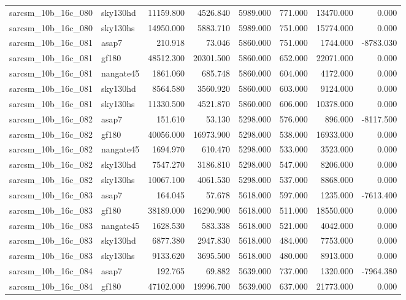 \begin{tabular}{llrrrrrr}
sarcsm\_10b\_16c\_080 & sky130hd & 11159.800 & 4526.840 & 5989.000 & 771.000 & 13470.000 & 0.000 \\
sarcsm\_10b\_16c\_080 & sky130hs & 14950.000 & 5883.710 & 5989.000 & 751.000 & 15774.000 & 0.000 \\
sarcsm\_10b\_16c\_081 & asap7 & 210.918 & 73.046 & 5860.000 & 751.000 & 1744.000 & -8783.030 \\
sarcsm\_10b\_16c\_081 & gf180 & 48512.300 & 20301.500 & 5860.000 & 652.000 & 22071.000 & 0.000 \\
sarcsm\_10b\_16c\_081 & nangate45 & 1861.060 & 685.748 & 5860.000 & 604.000 & 4172.000 & 0.000 \\
sarcsm\_10b\_16c\_081 & sky130hd & 8564.580 & 3560.920 & 5860.000 & 603.000 & 9124.000 & 0.000 \\
sarcsm\_10b\_16c\_081 & sky130hs & 11330.500 & 4521.870 & 5860.000 & 606.000 & 10378.000 & 0.000 \\
sarcsm\_10b\_16c\_082 & asap7 & 151.610 & 53.130 & 5298.000 & 576.000 & 896.000 & -8117.500 \\
sarcsm\_10b\_16c\_082 & gf180 & 40056.000 & 16973.900 & 5298.000 & 538.000 & 16933.000 & 0.000 \\
sarcsm\_10b\_16c\_082 & nangate45 & 1694.970 & 610.470 & 5298.000 & 533.000 & 3523.000 & 0.000 \\
sarcsm\_10b\_16c\_082 & sky130hd & 7547.270 & 3186.810 & 5298.000 & 547.000 & 8206.000 & 0.000 \\
sarcsm\_10b\_16c\_082 & sky130hs & 10067.100 & 4061.530 & 5298.000 & 537.000 & 8868.000 & 0.000 \\
sarcsm\_10b\_16c\_083 & asap7 & 164.045 & 57.678 & 5618.000 & 597.000 & 1235.000 & -7613.400 \\
sarcsm\_10b\_16c\_083 & gf180 & 38189.000 & 16290.900 & 5618.000 & 511.000 & 18550.000 & 0.000 \\
sarcsm\_10b\_16c\_083 & nangate45 & 1628.530 & 583.338 & 5618.000 & 521.000 & 4042.000 & 0.000 \\
sarcsm\_10b\_16c\_083 & sky130hd & 6877.380 & 2947.830 & 5618.000 & 484.000 & 7753.000 & 0.000 \\
sarcsm\_10b\_16c\_083 & sky130hs & 9133.620 & 3695.500 & 5618.000 & 480.000 & 8913.000 & 0.000 \\
sarcsm\_10b\_16c\_084 & asap7 & 192.765 & 69.882 & 5639.000 & 737.000 & 1320.000 & -7964.380 \\
sarcsm\_10b\_16c\_084 & gf180 & 47102.000 & 19996.700 & 5639.000 & 637.000 & 21773.000 & 0.000 \\

\end{tabular}
